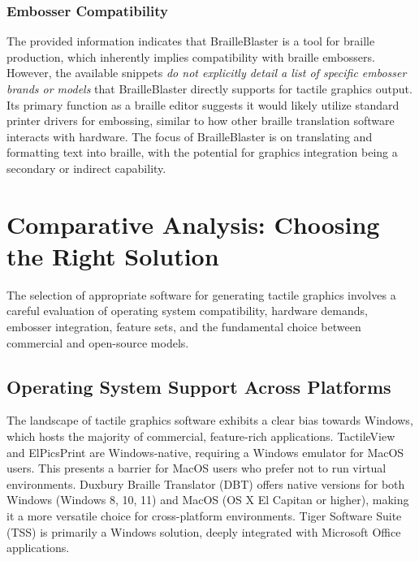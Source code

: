 \subsubsection{Embosser Compatibility}

The provided information indicates that BrailleBlaster is a tool for braille production, which inherently implies compatibility with braille embossers. However, the available snippets \emph{do not explicitly detail a list of specific embosser brands or models} that BrailleBlaster directly supports for tactile graphics output. Its primary function as a braille editor suggests it would likely utilize standard printer drivers for embossing, similar to how other braille translation software interacts with hardware. The focus of BrailleBlaster is on translating and formatting text into braille, with the potential for graphics integration being a secondary or indirect capability.

\section{Comparative Analysis: Choosing the Right Solution}\label{sec:comparative-analysis}

The selection of appropriate software for generating tactile graphics involves a careful evaluation of operating system compatibility, hardware demands, embosser integration, feature sets, and the fundamental choice between commercial and open-source models.

\subsection{Operating System Support Across Platforms}

\vspace{1em}

The landscape of tactile graphics software exhibits a clear bias towards Windows, which hosts the majority of commercial, feature-rich applications. TactileView and ElPicsPrint are Windows-native, requiring a Windows emulator for MacOS users. \cite{DuxburyDetails,BlindSVG,DuxburyNews} This presents a barrier for MacOS users who prefer not to run virtual environments. Duxbury Braille Translator (DBT) offers native versions for both Windows (Windows 8, 10, 11) and MacOS (OS X El Capitan or higher), making it a more versatile choice for cross-platform environments. Tiger Software Suite (TSS) is primarily a Windows solution, deeply integrated with Microsoft Office applications. \cite{EmeraldCoast,ElitaManual}



